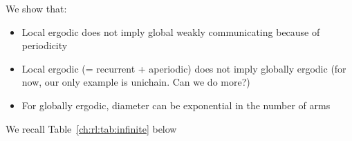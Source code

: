 

We show that:
\begin{itemize}
    \item Local ergodic does not imply global weakly communicating because of periodicity 
    \item Local ergodic (= recurrent + aperiodic) does not imply globally ergodic (for now, our only example is unichain. Can we do more?)
    \item For globally ergodic, diameter can be exponential in the number of arms
\end{itemize}

We recall Table~\ref{ch:rl:tab:infinite} below

